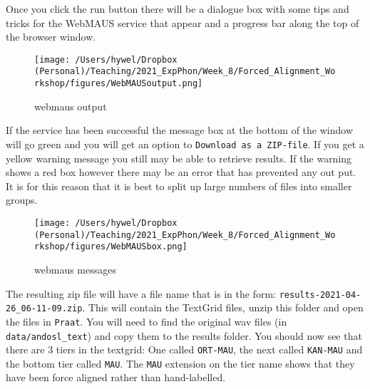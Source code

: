 \documentclass[
  11pt,
]{article}
\begin{document}
Once you click the run button there will be a dialogue box with some
tips and tricks for the WebMAUS service that appear and a progress bar
along the top of the browser window.

\begin{figure}
\centering
\texttt{[image: /Users/hywel/Dropbox (Personal)/Teaching/2021\_ExpPhon/Week\_8/Forced\_Alignment\_Workshop/figures/WebMAUSoutput.png]}
\caption{webmaus output}
\end{figure}

If the service has been successful the message box at the bottom of the
window will go green and you will get an option to
\texttt{Download\ as\ a\ ZIP-file}. If you get a yellow warning message
you still may be able to retrieve results. If the warning shows a red
box however there may be an error that has prevented any out put. It is
for this reason that it is best to split up large numbers of files into
smaller groups.

\begin{figure}
\centering
\texttt{[image: /Users/hywel/Dropbox (Personal)/Teaching/2021\_ExpPhon/Week\_8/Forced\_Alignment\_Workshop/figures/WebMAUSbox.png]}
\caption{webmaus messages}
\end{figure}

The resulting zip file will have a file name that is in the form:
\texttt{results-2021-04-26\_06-11-09.zip}. This will contain the
TextGrid files, unzip this folder and open the files in \texttt{Praat}.
You will need to find the original wav files (in
\texttt{data/andosl\_text}) and copy them to the results folder. You
should now see that there are 3 tiers in the textgrid: One called
\texttt{ORT-MAU}, the next called \texttt{KAN-MAU} and the bottom tier
called \texttt{MAU}. The \texttt{MAU} extension on the tier name shows
that they have been force aligned rather than hand-labelled.
\end{document}
